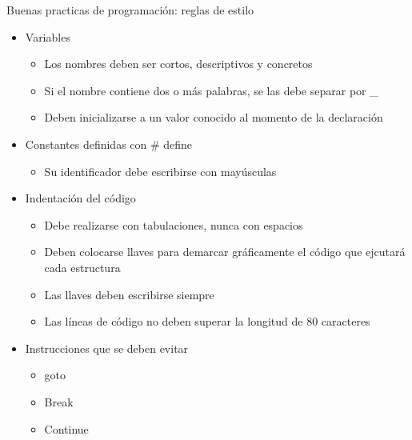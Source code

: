 \documentclass[xcolor=pdftex,table,11pt]{beamer}
\begin{document}
\begin{frame}{Buenas practicas de programación: reglas de estilo}
\begin{itemize}
\item<1-> Variables 
	\begin{itemize}
		\item<2-> Los nombres deben ser cortos, descriptivos y concretos
		\item<3-> Si el nombre contiene dos o más palabras, se las debe separar por \_
		\item<4-> Deben inicializarse a un valor conocido al momento de la declaración
	\end{itemize}
	
\item<5-> Constantes definidas con \# define 
	\begin{itemize}
		\item<6-> Su identificador debe escribirse con mayúsculas
	\end{itemize}



\item<7-> Indentación del código
	\begin{itemize}
		\item<8-> Debe realizarse con tabulaciones, nunca con espacios
		\item<9-> Deben colocarse llaves para demarcar gráficamente el código que ejcutará cada estructura

		\item<10-> Las llaves deben escribirse siempre
		
		\item<11-> Las líneas de código no deben superar la longitud de 80 caracteres

		
	\end{itemize}

\item<12-> Instrucciones que se deben evitar
	\begin{itemize}
		\item<13-> goto
		\item<14-> Break
		\item<15-> Continue

		
	\end{itemize}

\end{itemize}

    
\end{frame}
\end{document}
